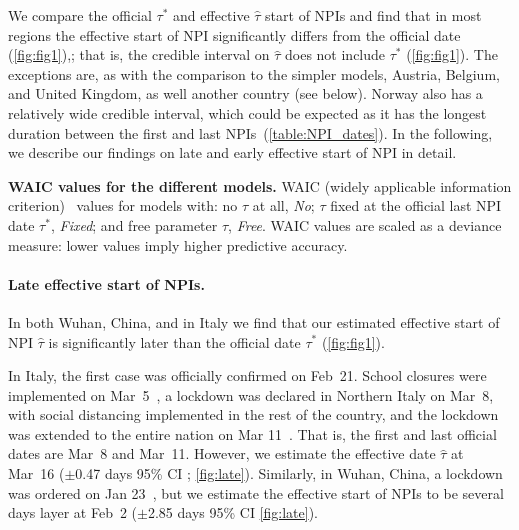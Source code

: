\documentclass[12pt]{extarticle}
\begin{document}
We compare the official $\tau^*$ and effective $\hat{\tau}$ start of NPIs and find that in most regions the effective start of NPI  significantly differs from the official date (\autoref{fig:fig1}),; that is, the credible interval on $\hat{\tau}$ does not include $\tau^*$ (\autoref{fig:fig1}). The exceptions are, as with the comparison to the simpler models, Austria, Belgium, and United Kingdom, as well another country (see below). Norway also has a relatively wide credible interval, which could be expected as it has the longest duration between the first and last NPIs~(\autoref{table:NPI_dates}).
In the following, we describe our findings on late and early effective start of NPI in detail.



\begin{table}[h]
\centering
{}
\caption{
\textbf{WAIC values for the different models.}
	WAIC (widely applicable information criterion)~\citep{gelman2013bayesian} values for models  with: no $\tau$ at all, \emph{No}; $\tau$ fixed at the official last NPI date $\tau^*$, \emph{Fixed}; and free parameter $\tau$, \emph{Free}. WAIC values are scaled as a deviance measure: lower values imply higher predictive accuracy.
}
\label{table:WAIC}
\end{table}



\paragraph*{Late effective start of NPIs.}
In both Wuhan, China, and in Italy we find that our estimated effective start of NPI $\hat{\tau}$ is significantly later than the official date $\tau^*$ (\autoref{fig:fig1}). 

In Italy, the first case was officially confirmed on Feb~21. School closures were implemented on Mar~5~\citep{Flaxman2020}, a lockdown was declared in Northern Italy on Mar~8, with social distancing implemented in the rest of the country, and the lockdown was extended to the entire nation on Mar 11~\citep{Gatto2020}.
That is, the first and last official dates are Mar~8 and Mar~11.
However, we estimate the effective date $\hat{\tau}$ at Mar~16 ($\pm$0.47 days 95\% CI ; \autoref{fig:late}).
Similarly, in Wuhan, China, a lockdown was ordered on Jan 23~\citep{Li2020}, but we estimate the effective start of NPIs to be several days layer at Feb~2 ($\pm$2.85 days 95\% CI \autoref{fig:late}).
\end{document}
